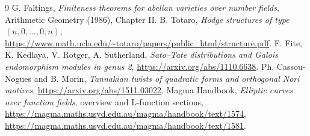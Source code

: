 \documentclass[11pt]{article}
\begin{document}
\begin{thebibliography}{9}
 G. Faltings, \emph{Finiteness theorems for abelian varieties
over number fields}, Arithmetic Geometry (1986), Chapter II.
 B. Totaro, \emph{Hodge structures of type $(n,0,\ldots,0,n)$},
\url{https://www.math.ucla.edu/~totaro/papers/public_html/structure.pdf}.
 F. Fite, K. Kedlaya, V. Rotger, A. Sutherland,
\emph{Sato--Tate distributions and Galois endomorphism modules in genus 2},
\url{https://arxiv.org/abs/1110.6638}.
 Ph. Cassou-Nogues and B. Morin,
\emph{Tannakian twists of quadratic forms and orthogonal Nori motives},
\url{https://arxiv.org/abs/1511.03022}.
 Magma Handbook, \emph{Elliptic curves over function fields},
overview and L-function sections,
\url{https://magma.maths.usyd.edu.au/magma/handbook/text/1574},
\url{https://magma.maths.usyd.edu.au/magma/handbook/text/1581}.
\end{thebibliography}
\end{document}
